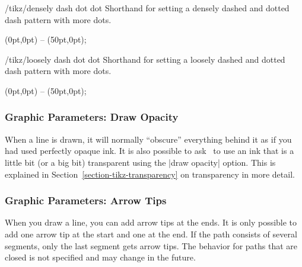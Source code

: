 \begin{stylekey}{/tikz/densely dash dot dot}
  Shorthand for setting a densely dashed and dotted dash pattern with more dots.

\begin{codeexample}[]
\tikz {} (0pt,0pt) -- (50pt,0pt);
\end{codeexample}
\end{stylekey}

\begin{stylekey}{/tikz/loosely dash dot dot}
  Shorthand for setting a loosely dashed and dotted dash pattern with more dots.

\begin{codeexample}[]
\tikz {} (0pt,0pt) -- (50pt,0pt);
\end{codeexample}
\end{stylekey}


\subsubsection{Graphic Parameters: Draw Opacity}

When a line is drawn, it will normally ``obscure'' everything behind
it as if you had used perfectly opaque ink. It is also possible to ask
\tikzname\ to use an ink that is a little bit (or a big bit)
transparent using the |draw opacity| option. This is explained in
Section~\ref{section-tikz-transparency} on transparency in more detail.



\subsubsection{Graphic Parameters: Arrow Tips}

When you draw a line, you can add arrow tips at the ends. It is
only possible to add one arrow tip at the start and one at the end. If
the path consists of several segments, only the last segment gets
arrow tips. The behavior for paths that are closed is not specified
and may change in the future.

